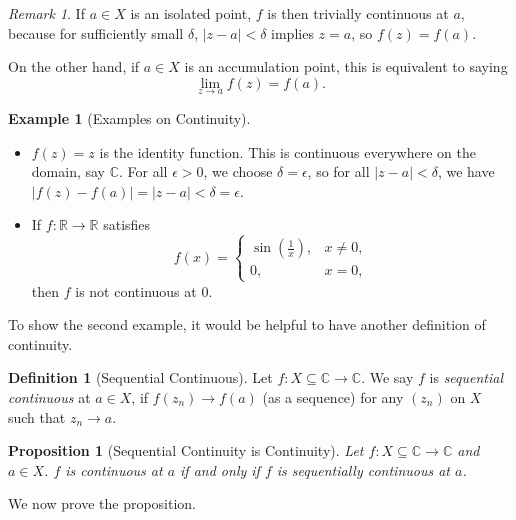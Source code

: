 \documentclass[11pt]{article}
\numberwithin{equation}{section}
\newtheorem{proposition}[theorem]{Proposition}
\theoremstyle{definition}
\newtheorem{definition}[theorem]{Definition}
\newtheorem{example}[theorem]{Example}
\theoremstyle{remark}
\newtheorem{remark}[theorem]{Remark}
\newcommand{\pqty}[1]{\left(#1\right)}
\newcommand{\abs}[1]{\left|#1\right|}
\newcommand{\functiondomain}[3]{#1:#2\to #3}
\newcommand{\RR}{\mathbb R}
\newcommand{\CC}{\mathbb C}
\begin{document}
\begin{remark}\label{analysis-unit-0079}
    If \(a \in X\) is an isolated point, \(f\) is then trivially continuous at \(a\), because for sufficiently small \(\delta\), \(\abs{z - a} < \delta\) implies \(z = a\), so \(f\pqty{z} = f\pqty{a}\).

    On the other hand, if \(a \in X\) is an accumulation point, this is equivalent to saying
    \[
        \lim_{z \to a} f\pqty{z} = f\pqty{a}.
    \] 
\end{remark}

\begin{example}[Examples on Continuity]\label{analysis-unit-0080}
    \label{ex:fn-continuity}
    \begin{itemize}
        \item \(f\pqty{z} = z\) is the identity function. This is continuous everywhere on the domain, say \(\CC\). For all \(\epsilon > 0\), we choose \(\delta = \epsilon\), so for all \(\abs{z - a} < \delta\), we have \(\abs{f\pqty{z} - f\pqty{a}} = \abs{z - a} < \delta = \epsilon\).

        \item If \(\functiondomain{f}{\RR}{\RR}\) satisfies \[
            f\pqty{x} = \begin{cases}
                \sin \pqty{\frac{1}{x}}, & x \neq 0, \\
                0, & x = 0,
            \end{cases}
        \]
        then \(f\) is not continuous at \(0\).
    \end{itemize}
\end{example}

To show the second example, it would be helpful to have another definition of continuity.

\begin{definition}[Sequential Continuous]\label{analysis-unit-0081}
    \label{def:fn-sequential-continuous}%
    Let \(\functiondomain{f}{X \subseteq \CC}{\CC}\). We say \(f\) is \emph{sequential continuous} at \(a \in X\), if \(f\pqty{z_n} \to f\pqty{a}\) (as a sequence) for any \(\pqty{z_n}\) on \(X\) such that \(z_n \to a\).
\end{definition}

\begin{proposition}[Sequential Continuity is Continuity]\label{analysis-unit-0082}
    \label{prop:fn-seq-cont-iff-cont}%
    Let \(\functiondomain{f}{X \subseteq \CC}{\CC}\) and \(a \in X\). \(f\) is continuous at \(a\) if and only if \(f\) is sequentially continuous at \(a\).
\end{proposition}
We now prove the proposition.
\end{document}
